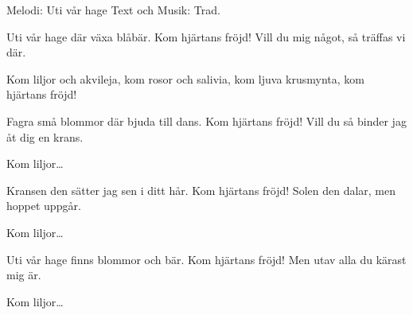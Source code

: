 \begin{song}

\begin{songmeta}
Melodi: Uti vår hage
Text och Musik: Trad.
\end{songmeta}

\begin{songtext}
Uti vår hage där växa blåbär.
Kom hjärtans fröjd!
Vill du mig något, så träffas vi där.

Kom liljor och akvileja,
kom rosor och salivia,
kom ljuva krusmynta, kom hjärtans fröjd!

Fagra små blommor där bjuda till dans.
Kom hjärtans fröjd!
Vill du så binder jag åt dig en krans.

Kom liljor\ldots

Kransen den sätter jag sen i ditt hår.
Kom hjärtans fröjd!
Solen den dalar, men hoppet uppgår.

Kom liljor\ldots

Uti vår hage finns blommor och bär.
Kom hjärtans fröjd!
Men utav alla du kärast mig är.

Kom liljor\ldots
\end{songtext}
\end{song}
